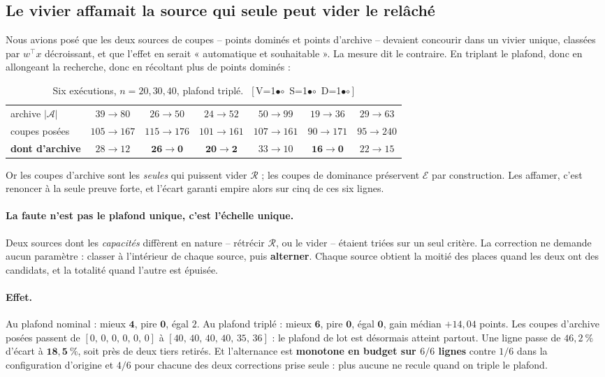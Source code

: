 \documentclass[11pt,a4paper]{article}
\theoremstyle{plain}
\theoremstyle{remark}
\newcommand{\Ecal}{\mathcal{E}}
\newcommand{\Rcal}{\mathcal{R}}
\newcommand{\Acal}{\mathcal{A}}
\newcommand{\cfgm}[1]{\ifnum#1=1$\bullet$\else$\circ$\fi}
\newcommand{\conf}[3]{%
  \textsf{\footnotesize[\,V\cfgm{#1}\ S\cfgm{#2}\ D\cfgm{#3}\,]}}
\begin{document}
\subsection{Le vivier affamait la source qui seule peut vider le relâché}

Nous avions posé que les deux sources de coupes -- points dominés et points
d'archive -- devaient concourir dans un vivier unique, classées par
$w^{\top}x$ décroissant, et que l'effet en serait « automatique et
souhaitable ». La mesure dit le contraire. En triplant le plafond, donc en
allongeant la recherche, donc en récoltant plus de points dominés :

\begin{table}[H]
\centering
\caption{Six exécutions, $n=20,30,40$, plafond triplé.\ \conf{0}{1}{0}}
\begin{tabular}{lcccccc}
\toprule
archive $|\Acal|$ & $39\!\to\!80$ & $26\!\to\!50$ & $24\!\to\!52$
 & $50\!\to\!99$ & $19\!\to\!36$ & $29\!\to\!63$\\
coupes posées & $105\!\to\!167$ & $115\!\to\!176$ & $101\!\to\!161$
 & $107\!\to\!161$ & $90\!\to\!171$ & $95\!\to\!240$\\
\textbf{dont d'archive} & $28\!\to\!12$ & $\mathbf{26\!\to\!0}$
 & $\mathbf{20\!\to\!2}$ & $33\!\to\!10$ & $\mathbf{16\!\to\!0}$
 & $22\!\to\!15$\\
\bottomrule
\end{tabular}
\end{table}

Or les coupes d'archive sont les \emph{seules} qui puissent vider $\Rcal$ ;
les coupes de dominance préservent $\Ecal$ par construction. Les affamer,
c'est renoncer à la seule preuve forte, et l'écart garanti empire alors sur
cinq de ces six lignes.

\paragraph{La faute n'est pas le plafond unique, c'est l'échelle unique.}
Deux sources dont les \emph{capacités} diffèrent en nature -- rétrécir
$\Rcal$, ou le vider -- étaient triées sur un seul critère. La correction ne
demande aucun paramètre : classer à l'intérieur de chaque source, puis
\textbf{alterner}. Chaque source obtient la moitié des places quand les deux
ont des candidats, et la totalité quand l'autre est épuisée.

\paragraph{Effet.} Au plafond nominal : mieux $\mathbf{4}$, pire
$\mathbf{0}$, égal $2$. Au plafond triplé : mieux $\mathbf{6}$, pire
$\mathbf{0}$, égal $\mathbf{0}$, gain médian $+14{,}04$ points. Les coupes
d'archive posées passent de $[0,\,0,\,0,\,0,\,0,\,0]$ à
$[40,\,40,\,40,\,40,\,35,\,36]$ : le plafond de lot est désormais atteint
partout. Une ligne passe de $46{,}2\ \%$ d'écart à $\mathbf{18{,}5\ \%}$,
soit près de deux tiers retirés. Et l'alternance est \textbf{monotone en
budget sur $6/6$ lignes} contre $1/6$ dans la configuration d'origine et
$4/6$ pour chacune des deux corrections prise seule : plus aucune ne
recule quand on triple le plafond.
\end{document}
